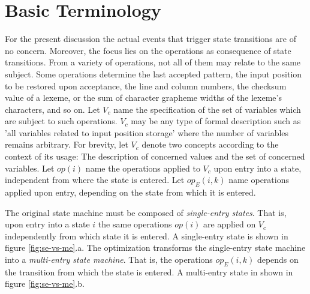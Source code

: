 \documentclass[12pt,a4paper]{scrartcl}
\begin{document}
%
\section{Basic Terminology}

For the present discussion the actual events that trigger state transitions are
of no concern. Moreover, the focus lies on the operations as consequence of
state transitions.  From a variety of operations, not all of them may relate to
the same subject.  Some operations determine the last accepted pattern, the
input position to be restored upon acceptance, the line and column numbers, the
checksum value of a lexeme, or the sum of character grapheme widths of the
lexeme's characters, and so on. Let $V_c$ name the specification of the set of
variables which are subject to such operations. $V_c$ may be any type of formal
description such as 'all variables related to input position storage' where the
number of variables remains arbitrary.  For brevity, let $V_c$ denote two
concepts according to the context of its usage: The description of concerned
values and the set of concerned variables. Let $op(i)$ name the operations
applied to $V_c$ upon entry into a state, independent from where the state is
entered. Let $op_E(i,k)$ name operations applied upon entry, depending on the
state from which it is  entered.

The original state machine must be composed of \textit{single-entry states}.
That is, upon entry into a state $i$ the same operations $op(i)$ are applied on
$V_c$ independently from which state it is entered.  A single-entry state is
shown in figure \ref{fig:se-vs-me}.a. The optimization transforms the
single-entry state machine into a \textit{multi-entry state machine}.  That is,
the operations $op_E(i,k)$ depends on the transition from which the state is
entered. A multi-entry state in shown in figure \ref{fig:se-vs-me}.b.
\end{document}
